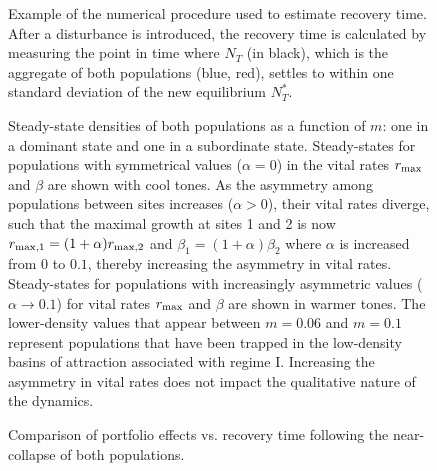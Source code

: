 \documentclass{revtex4}
\newcommand{\beginsupplement}{%
        \clearpage
        \setcounter{table}{0}
        \renewcommand{\thetable}{S\arabic{table}}%
        \setcounter{figure}{0}
        \renewcommand{\thefigure}{S\arabic{figure}}%
     }
\begin{document}

\beginsupplement



\begin{figure}
  \captionsetup{justification=raggedright,
singlelinecheck=false
}
\centering
\caption{
Example of the numerical procedure used to estimate recovery time. After a disturbance is introduced, the recovery time is calculated by measuring the point in time where $N_T$ (in black), which is the aggregate of both populations (blue, red), settles to within one standard deviation of the new equilibrium $N_T^*$. 
} \label{fig:recovery}
\end{figure}



\begin{figure}
  \captionsetup{justification=raggedright,
singlelinecheck=false
}
\centering
\caption{
Steady-state densities of both populations as a function of $m$: one in a dominant state and one in a subordinate state.
Steady-states for populations with symmetrical values ($\alpha=0$) in the vital rates $r_{\rm max}$ and $\beta$ are shown with cool tones.
As the asymmetry among populations between sites increases ($\alpha>0$), their vital rates diverge, such that the maximal growth at sites 1 and 2 is now $r_{\rm max,1}=(1 + \alpha)r_{\rm max,2}$ and $\beta_1=(1+\alpha)\beta_2$ where $\alpha$ is increased from $0$ to $0.1$, thereby increasing the asymmetry in vital rates.
Steady-states for populations with increasingly asymmetric values ($\alpha\rightarrow 0.1$) for vital rates $r_{\rm max}$ and $\beta$ are shown in warmer tones.
The lower-density values that appear between $m=0.06$ and $m=0.1$ represent populations that have been trapped in the low-density basins of attraction associated with regime I.
Increasing the asymmetry in vital rates does not impact the qualitative nature of the dynamics.
} \label{fig:symmetry}
\end{figure}




\begin{figure}
  \captionsetup{justification=raggedright,
singlelinecheck=false
}
\centering
\caption{
Comparison of portfolio effects vs. recovery time following the near-collapse of both populations.
} \label{fig:pevsrt}
\end{figure}
\end{document}
